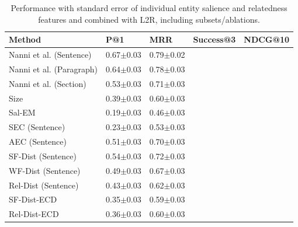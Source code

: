 \begin{table}[t]
    \caption{Performance with standard error of individual entity salience and relatedness features and combined with L2R, including subsets/ablations.}
    \label{tab:Results-shubham}
    \begin{tabular}{@{}lllll@{}}
        \toprule
        Method & P@1 & MRR & Success@3 & NDCG@10 \\
        
        \midrule
        
        Nanni et al. (Sentence) &
        0.67$\pm$0.03 & 0.79$\pm$0.02 \\
        
         Nanni et al. (Paragraph) &
        0.64$\pm$0.03  & 0.78$\pm$0.03 \\
        
         Nanni et al. (Section) &
       0.53$\pm$0.03 & 0.71$\pm$0.03 \\
     
      Size &
      0.39$\pm$0.03&
      0.60$\pm$0.03
      \\
      
      \midrule
      
     
    Sal-EM   &   
      0.19$\pm$0.03 &
      0.46$\pm$0.03
      \\
      
      
      
      SEC (Sentence)  &    
      0.23$\pm$0.03 &
      0.53$\pm$0.03
      \\
      
      
      AEC (Sentence)   &    
      0.51$\pm$0.03 &
      0.70$\pm$0.03
      \\
       \midrule
      
     
      SF-Dist (Sentence)   &    
      0.54$\pm$0.03 &
      0.72$\pm$0.03
      \\
      
     
      WF-Dist (Sentence)  &    
      0.49$\pm$0.03 &
      0.67$\pm$0.03
      \\
      
      
      Rel-Dist (Sentence)  &    
      0.43$\pm$0.03 &
     0.62$\pm$0.03
      \\
       \midrule
      
    
      SF-Dist-ECD   &    
      0.35$\pm$0.03 &
      0.59$\pm$0.03
      \\
      
      
      Rel-Dist-ECD  &    
      0.36$\pm$0.03 &
      0.60$\pm$0.03
      \\
      

\end{tabular}
\end{table}
